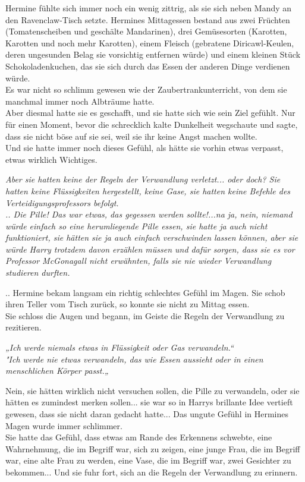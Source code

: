 {Hermine fühlte sich immer noch ein wenig zittrig, als sie sich neben Mandy an den Ravenclaw-Tisch setzte. Hermines Mittagessen bestand aus zwei Früchten (Tomatenscheiben und geschälte Mandarinen), drei Gemüsesorten (Karotten, Karotten und noch mehr Karotten), einem Fleisch (gebratene Diricawl-Keulen, deren ungesunden Belag sie vorsichtig entfernen würde) und einem kleinen Stück Schokoladenkuchen, das sie sich durch das Essen der anderen Dinge verdienen würde.\\ Es war nicht so schlimm gewesen wie der Zaubertrankunterricht, von dem sie manchmal immer noch Albträume hatte.\\ Aber diesmal hatte sie es geschafft, und sie hatte sich wie sein Ziel gefühlt. Nur für einen Moment, bevor die schrecklich kalte Dunkelheit wegschaute und sagte, dass sie nicht böse auf sie sei, weil sie ihr keine Angst machen wollte.\\ Und sie hatte immer noch dieses Gefühl, als hätte sie vorhin etwas verpasst, etwas wirklich Wichtiges.

\emph{Aber sie hatten keine der Regeln der Verwandlung verletzt... oder doch? Sie hatten keine Flüssigkeiten hergestellt, keine Gase, sie hatten keine Befehle des Verteidigungsprofessors befolgt.\\ .. Die Pille! Das war etwas, das gegessen werden sollte!...na ja, nein, niemand würde einfach so eine herumliegende Pille essen, sie hatte ja auch nicht funktioniert, sie hätten sie ja auch einfach verschwinden lassen können, aber sie würde Harry trotzdem davon erzählen müssen und dafür sorgen, dass sie es vor Professor McGonagall nicht erwähnten, falls sie nie wieder Verwandlung studieren durften.}

.. Hermine bekam langsam ein richtig schlechtes Gefühl im Magen. Sie schob ihren Teller vom Tisch zurück, so konnte sie nicht zu Mittag essen.\\ Sie schloss die Augen und begann, im Geiste die Regeln der Verwandlung zu rezitieren.

\emph{„Ich werde niemals etwas in Flüssigkeit oder Gas verwandeln.“}\\ \emph{"Ich werde nie etwas verwandeln, das wie Essen aussieht oder in einen menschlichen Körper passt.„}

Nein, sie hätten wirklich nicht versuchen sollen, die Pille zu verwandeln, oder sie hätten es zumindest merken sollen... sie war so in Harrys brillante Idee vertieft gewesen, dass sie nicht daran gedacht hatte... Das ungute Gefühl in Hermines Magen wurde immer schlimmer.\\ Sie hatte das Gefühl, dass etwas am Rande des Erkennens schwebte, eine Wahrnehmung, die im Begriff war, sich zu zeigen, eine junge Frau, die im Begriff war, eine alte Frau zu werden, eine Vase, die im Begriff war, zwei Gesichter zu bekommen... Und sie fuhr fort, sich an die Regeln der Verwandlung zu erinnern.

}
